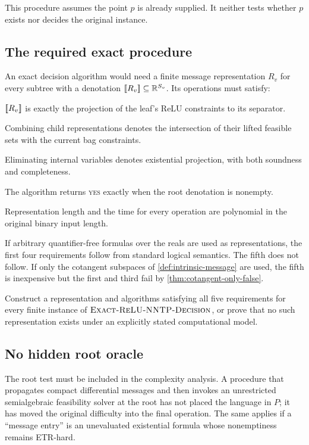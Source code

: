 This procedure assumes the point \(p\) is already supplied.  It neither tests
whether \(p\) exists nor decides the original instance.

\subsection{The required exact procedure}

An exact decision algorithm would need a finite message representation
\(R_v\) for every subtree with a denotation
\(\left[\!\left[R_v\right]\!\right]\subseteq\mathbb{R}^{S_v}\).  Its operations must satisfy:

\begin{description}[leftmargin=3.4cm,style=nextline]
  \item[Leaf construction]
  \(\left[\!\left[R_v\right]\!\right]\) is exactly the projection of the leaf's ReLU
  constraints to its separator.

  \item[Merge]
  Combining child representations denotes the intersection of their lifted
  feasible sets with the current bag constraints.

  \item[Contraction]
  Eliminating internal variables denotes existential projection, with both
  soundness and completeness.

  \item[Root test]
  The algorithm returns \textsc{yes} exactly when the root denotation is
  nonempty.

  \item[Complexity]
  Representation length and the time for every operation are polynomial in
  the original binary input length.
\end{description}

If arbitrary quantifier-free formulas over the reals are used as
representations, the first four requirements follow from standard logical
semantics.  The fifth does not follow.  If only the cotangent subspaces of
\cref{def:intrinsic-message} are used, the fifth is inexpensive but the first
and third fail by \cref{thm:cotangent-only-false}.

\begin{problem}
\label{prob:polynomial-semantic-message}
Construct a representation and algorithms satisfying all five requirements
for every finite instance of \(\textnormal{\textsc{Exact-ReLU-NNTP-Decision}}\), or prove that no such
representation exists under an explicitly stated computational model.
\end{problem}

\subsection{No hidden root oracle}

The root test must be included in the complexity analysis.  A procedure that
propagates compact differential messages and then invokes an unrestricted
semialgebraic feasibility solver at the root has not placed the language in
\(P\); it has moved the original difficulty into the final operation.  The
same applies if a ``message entry'' is an unevaluated existential formula whose
nonemptiness remains ETR-hard.

